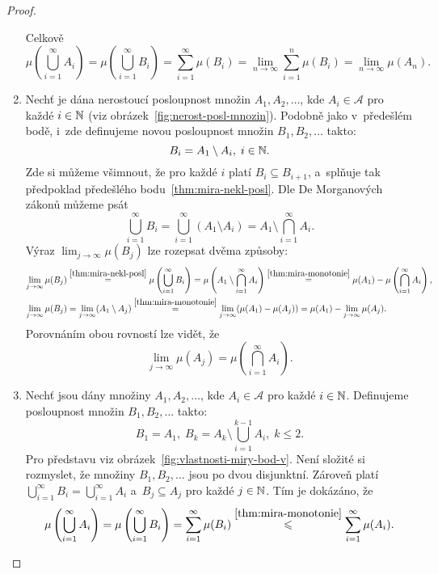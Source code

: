 \begin{proof}
\begin{enumerate}[label=\textit{(\roman*)}]
        Celkově
        \[\mu\left(\bigcup_{i=1}^\infty A_i\right)=\mu\left(\bigcup_{i=1}^\infty B_i\right)=\sum_{i=1}^{\infty}\mu(B_i)=\lim_{n\to\infty}\sum_{i=1}^{n}\mu(B_i)=\lim_{n\to\infty}\mu(A_n).\]
        \item Nechť je dána nerostoucí posloupnost množin $A_1,A_2,\ldots$, kde $A_i\in\mathcal{A}$ pro každé $i\in\mathbb{N}$ (viz obrázek~\ref{fig:nerost-posl-mnozin}). Podobně jako v~předešlém bodě, i~zde definujeme novou posloupnost množin $B_1,B_2,\ldots$ takto:
        \[B_i=A_1\setminus A_i,\;i\in\mathbb{N}.\]
        Zde si můžeme všimnout, že pro každé $i$ platí $B_i\subseteq B_{i+1}$, a~splňuje tak předpoklad předešlého bodu~\ref{thm:mira-nekl-posl}. Dle De Morganových zákonů můžeme psát
        \[\bigcup_{i=1}^\infty B_i=\bigcup_{i=1}^\infty(A_1\setminus A_i)=A_1\setminus\bigcap_{i=1}^\infty A_i.\]
        Výraz $\lim_{j\to\infty}\mu(B_j)$ lze rozepsat dvěma způsoby:
        \begin{align*}
            \lim\limits_{j\to\infty}\mu(B_j)&\stackrel{\ref{thm:mira-nekl-posl}}{=}\mu\left(\bigcup\limits_{i=1}^\infty B_i\right)=\mu\left(A_1\setminus\bigcap\limits_{i=1}^\infty A_i\right)\stackrel{\ref{thm:mira-monotonie}}{=}\mu(A_1)-\mu\left(\bigcap\limits_{i=1}^\infty A_i\right),\\
            \lim\limits_{j\to\infty}\mu(B_j)&=\lim_{j\to\infty}(A_1\setminus A_j)\stackrel{\ref{thm:mira-monotonie}}{=}\lim_{j\to\infty}(\mu(A_1)-\mu(A_j))=\mu(A_1)-\lim_{j\to\infty}\mu(A_j).
        \end{align*}
        Porovnáním obou rovností lze vidět, že
        \[\lim_{j\to\infty}\mu(A_j)=\mu\left(\bigcap\limits_{i=1}^\infty A_i\right).\]
        \item Nechť jsou dány množiny $A_1,A_2,\ldots$, kde $A_i\in\mathcal{A}$ pro každé $i\in\mathbb{N}$. Definujeme posloupnost množin $B_1,B_2,\ldots$ takto:
        \[B_1=A_1,\;B_k=A_k\setminus\bigcup_{i=1}^{k-1} A_i,\;k\leqslant 2.\]
        Pro představu viz obrázek~\ref{fig:vlastnosti-miry-bod-v}. Není složité si rozmyslet, že množiny $B_1,B_2,\ldots$ jsou po dvou disjunktní. Zároveň platí $\bigcup_{i=1}^\infty B_i=\bigcup_{i=1}^\infty A_i$ a~$B_j\subseteq A_j$ pro každé $j\in\mathbb{N}$. Tím je dokázáno, že
        \[\mu\left(\bigcup_{i=1}^\infty A_i\right)=\mu\left(\bigcup_{i=1}^\infty B_i\right)=\sum_{i=1}^{\infty}\mu(B_i)\stackrel{\ref{thm:mira-monotonie}}{\leqslant}\sum_{i=1}^{\infty}\mu(A_i).\]
    \end{enumerate}
    \begin{figure}[h]
        \centering
        \begin{subfigure}{0.45\textwidth}

\end{subfigure}
\end{figure}
\end{proof}

